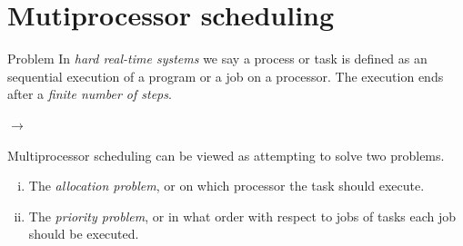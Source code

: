 \documentclass{beamer}
\begin{document}

	
	\section{Mutiprocessor scheduling}
	
	\begin{frame}{Problem}	
	In \emph{hard real-time systems}  we say a process or task is defined as an sequential execution of a program or a job on a processor.
	The execution ends after a \emph{finite number of steps}.

	$\rightarrow$
	
	\begin{definition}
			\label{remark:problems}
			Multiprocessor scheduling can be viewed as attempting  to solve two problems.
			\begin{enumerate}[(i)]
				\item The \emph{allocation problem}, or on which processor the task should execute.
				\item The \emph{priority problem}, or in what order with respect to jobs of tasks each job should be executed.
			\end{enumerate}
		\end{definition}
	\end{frame}
	
 
      


%      
%      

	
\end{document}
